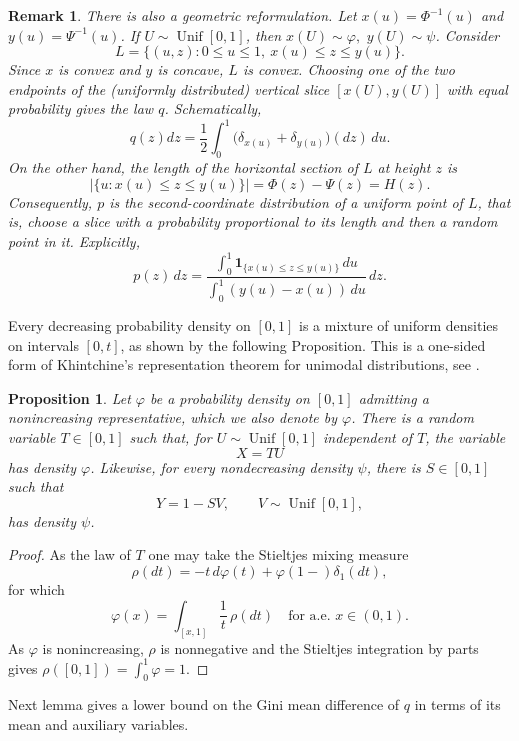 \documentclass[final,12pt]{elsarticle}
\numberwithin{equation}{section}
\newtheorem{prop}[thm]{Proposition}
\newtheorem{rem}[thm]{Remark}
\theoremstyle{remark}
\newcommand{\Unif}{\operatorname{Unif}}
\theoremstyle{definition}
\begin{document}
\begin{rem}
There is also a geometric reformulation.  Let $x(u)=\Phi^{-1}(u)$ and $y(u)=\Psi^{-1}(u)$. If $U\sim\Unif[0,1]$, then $ x(U)\sim \varphi,\,\,  y(U) \sim \psi$. Consider
$$
    L=\{(u,z):0\leq u\leq 1,\ x(u)\leq z\leq y(u)\}.
$$
Since $x$ is convex and $y$ is concave, $L$ is convex. Choosing one of the two endpoints
of the (uniformly distributed) vertical slice $[x(U),y(U)]$ with equal probability gives the law $q$.
Schematically,
$$
 q(z)dz=\frac12\int_0^1\bigl(\delta_{x(u)}+\delta_{y(u)}\bigr)(dz)\,du.
$$
 On the other hand, the length of the horizontal section of $L$ at height $z$ is
    $$\bigl|\{u:x(u)\leq z\leq y(u)\}\bigr|
    =\Phi(z)-\Psi(z)=H(z). $$
Consequently, $p$ is the second-coordinate distribution of a uniform
point of $L$, that is, choose a slice with a probability proportional to its length and then a random point in it. Explicitly, 
$$
 p(z)\,dz
 =\frac{\displaystyle\int_0^1
 \mathbf 1_{\{x(u)\le z\le y(u)\}}\,du}
 {\displaystyle\int_0^1(y(u)-x(u))\,du}\,dz.
$$ 
\end{rem}

Every decreasing probability density on $[0,1]$ is a mixture of uniform densities on intervals $[0,t]$, as shown by the following Proposition. This is a one-sided form of Khintchine’s representation theorem for unimodal distributions, see \cite{Khintchine}.

\begin{prop} \label{prop:monotone_factoriz}
Let $\varphi$ be a probability density on $[0,1]$ admitting a nonincreasing representative, which we also denote by $\varphi$. There is a random variable $T\in[0,1]$ such that, for $U\sim\Unif[0,1]$ independent of $T$, the variable
$$
 X=TU
$$
has density $\varphi$. Likewise, for every nondecreasing density $\psi$, there is $S\in[0,1]$ such that
$$
 Y=1-SV,
 \qquad V\sim\Unif[0,1],
$$
has density $\psi$.
\end{prop}
    \begin{proof}
        
     As the law of $T$ one may take the Stieltjes mixing measure 
$$
 \rho(dt)=-t\,d\varphi(t)+\varphi(1-)\delta_1(dt),
$$
for which
$$
 \varphi(x)=\int_{[x,1]}\frac1t\,\rho(dt) \quad \text{for a.e. } x\in (0,1) .
$$ 
As $\varphi$ is nonincreasing, $\rho$ is nonnegative and the Stieltjes integration by parts gives $\rho ([0,1]) = \int_0^1 \varphi = 1.$
\end{proof}

Next lemma gives a lower bound on the Gini mean difference of $q$ in terms of its mean and auxiliary variables.
\end{document}
